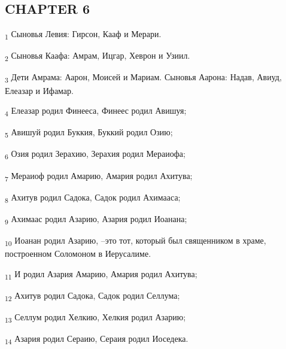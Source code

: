 \subsection{CHAPTER 6}
\begin{tcolorbox}
\textsubscript{1} Сыновья Левия: Гирсон, Кааф и Мерари.
\end{tcolorbox}
\begin{tcolorbox}
\textsubscript{2} Сыновья Каафа: Амрам, Ицгар, Хеврон и Узиил.
\end{tcolorbox}
\begin{tcolorbox}
\textsubscript{3} Дети Амрама: Аарон, Моисей и Мариам. Сыновья Аарона: Надав, Авиуд, Елеазар и Ифамар.
\end{tcolorbox}
\begin{tcolorbox}
\textsubscript{4} Елеазар родил Финееса, Финеес родил Авишуя;
\end{tcolorbox}
\begin{tcolorbox}
\textsubscript{5} Авишуй родил Буккия, Буккий родил Озию;
\end{tcolorbox}
\begin{tcolorbox}
\textsubscript{6} Озия родил Зерахию, Зерахия родил Мераиофа;
\end{tcolorbox}
\begin{tcolorbox}
\textsubscript{7} Мераиоф родил Амарию, Амария родил Ахитува;
\end{tcolorbox}
\begin{tcolorbox}
\textsubscript{8} Ахитув родил Садока, Садок родил Ахимааса;
\end{tcolorbox}
\begin{tcolorbox}
\textsubscript{9} Ахимаас родил Азарию, Азария родил Иоанана;
\end{tcolorbox}
\begin{tcolorbox}
\textsubscript{10} Иоанан родил Азарию, --это тот, который был священником в храме, построенном Соломоном в Иерусалиме.
\end{tcolorbox}
\begin{tcolorbox}
\textsubscript{11} И родил Азария Амарию, Амария родил Ахитува;
\end{tcolorbox}
\begin{tcolorbox}
\textsubscript{12} Ахитув родил Садока, Садок родил Селлума;
\end{tcolorbox}
\begin{tcolorbox}
\textsubscript{13} Селлум родил Хелкию, Хелкия родил Азарию;
\end{tcolorbox}
\begin{tcolorbox}
\textsubscript{14} Азария родил Сераию, Сераия родил Иоседека.
\end{tcolorbox}
